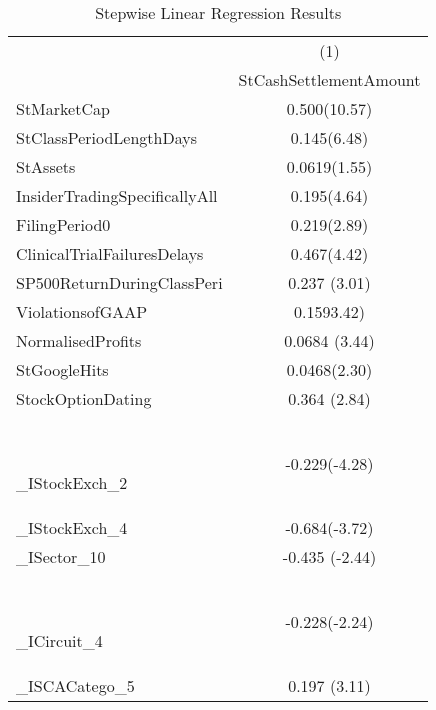 \begin{table}[H]
\centering 
\footnotesize
\caption{Stepwise Linear Regression Results}
\label{stepwiselinear}
\begin{tabular}{l*{1}{c}} \hline\hline
                    &\multicolumn{1}{c}{(1)}\\
                    &\multicolumn{1}{c}{StCashSettlementAmount}\\
\hline
StMarketCap         &       0.500(10.57)\\

StClassPeriodLengthDays&       0.145(6.48)\\

StAssets            &      0.0619(1.55)\\

InsiderTradingSpecificallyAll&       0.195(4.64)\\
            
FilingPeriod0       &       0.219(2.89)\\
            
ClinicalTrialFailuresDelays&       0.467(4.42)\\
                
SP500ReturnDuringClassPeri&       0.237 (3.01)\\
        
ViolationsofGAAP    &       0.1593.42)\\
                
NormalisedProfits   &      0.0684 (3.44)\\
             
StGoogleHits        &      0.0468(2.30)\\
                    
StockOptionDating   &       0.364 (2.84)\\\
                 
\_IStockExch\_2       &      -0.229(-4.28)\\
               
\_IStockExch\_4       &      -0.684(-3.72)\\
               
\_ISector\_10         &      -0.435 (-2.44)\\\
                   
\_ICircuit\_4         &      -0.228(-2.24)\\
                  
\_ISCACatego\_5       &       0.197 (3.11)\\
           

\end{tabular}
\end{table}
